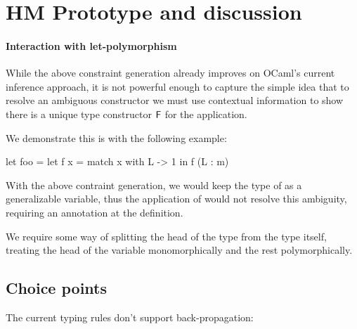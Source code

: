 \documentclass[acmsmall,screen,nonacm]{acmart}
\begin{document}






\section{HM Prototype and discussion}
\label{sec:implementation}





\paragraph{Interaction with let-polymorphism}


While the above constraint generation already improves on
OCaml's current inference approach, it is not powerful enough to capture the
simple idea that to resolve an ambiguous constructor we must use contextual
information to show there is a unique type constructor $\mathrel{\mathsf{F}}\mathclose{}$ for the
application.

We demonstrate this is with the following example:
\begin{program}
let foo =
  let f x = match x with L -> 1 in
  f (L : m)
\end{program}
With the above contraint generation, we would keep the type of 
as a generalizable variable, thus the application of  would not
resolve this ambiguity, requiring an annotation at the definition.

We require some way of splitting the head of the type from the type itself,
treating the head of the variable monomorphically and the rest
polymorphically.

\subsection{Choice points}

The current typing rules don't support back-propagation:
\end{document}

